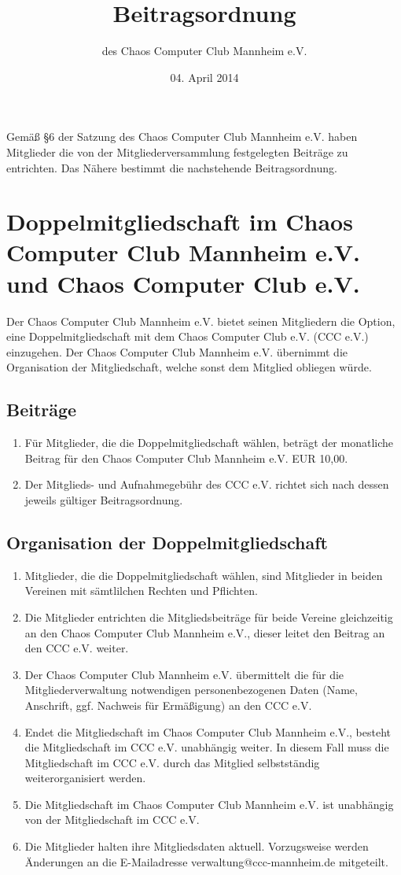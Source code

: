 \documentclass[a4paper, 12pt]{scrartcl}
\title{Beitragsordnung}
\subtitle{des Chaos Computer Club Mannheim e.V.}
\date{04. April 2014}
\begin{document}
\maketitle
\sffamily
\noindent Gemäß §6 der Satzung des Chaos Computer Club Mannheim e.V. haben Mitglieder die von der Mitgliederversammlung festgelegten Beiträge zu entrichten. Das Nähere bestimmt die nachstehende Beitragsordnung.

\section{Doppelmitgliedschaft im Chaos Computer Club Mannheim e.V. und Chaos Computer Club e.V.}
\label{doppelmitgliedscahft}
Der Chaos Computer Club Mannheim e.V. bietet seinen Mitgliedern die Option, eine Doppelmitgliedschaft mit dem Chaos Computer Club e.V. (CCC e.V.) einzugehen. Der Chaos Computer Club Mannheim e.V. übernimmt die Organisation der Mitgliedschaft, welche sonst dem Mitglied obliegen würde.

\subsection{Beiträge}	
\label{doppelbeiträge}
\begin{enumerate}
	\item \label{doppeljahresbeitrag} Für Mitglieder, die die Doppelmitgliedschaft wählen, beträgt der monatliche Beitrag für den Chaos Computer Club Mannheim e.V. EUR 10,00.
	\item Der Mitglieds- und Aufnahmegebühr des CCC e.V. richtet sich nach dessen jeweils gültiger Beitragsordnung.
\end{enumerate}

\subsection{Organisation der Doppelmitgliedschaft}
\begin{enumerate}	
  \item Mitglieder, die die Doppelmitgliedschaft wählen, sind Mitglieder in beiden Vereinen mit sämtlilchen Rechten und Pflichten.
	\item Die Mitglieder entrichten die Mitgliedsbeiträge für beide Vereine gleichzeitig an den Chaos Computer Club Mannheim e.V., dieser leitet den Beitrag an den CCC e.V. weiter.
	\item Der Chaos Computer Club Mannheim e.V. übermittelt die für die Mitgliederverwaltung notwendigen personenbezogenen Daten (Name, Anschrift, ggf. Nachweis für Ermäßigung) an den CCC e.V.
	\item Endet die Mitgliedschaft im Chaos Computer Club Mannheim e.V., besteht die Mitgliedschaft im CCC e.V. unabhängig weiter. In diesem Fall muss die Mitgliedschaft im CCC e.V. durch das Mitglied selbstständig weiterorganisiert werden.
	\item Die Mitgliedschaft im Chaos Computer Club Mannheim e.V. ist unabhängig von der Mitgliedschaft im CCC e.V.
	\item Die Mitglieder halten ihre Mitgliedsdaten aktuell. Vorzugsweise werden Änderungen an die E-Mailadresse verwaltung@ccc-mannheim.de mitgeteilt. 
\end{enumerate}
\end{document}
